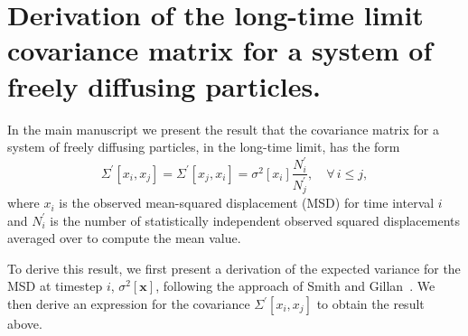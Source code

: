 \documentclass[reprint,superscriptaddress,nobibnotes,amsmath,amssymb,aps,prx,hidelinks,linenumbers]{revtex4-2}
\newcommand{\oMSD}{\ensuremath{\bm{x}}}
\newcommand{\oMSDi}{\ensuremath{x_i}}
\newcommand{\oMSDj}{\ensuremath{x_j}}
\newcommand{\nind}[1]{\ensuremath{N^\prime_{#1}}}
\newcommand{\var}[1]{\ensuremath{\sigma^2[#1]}}
\begin{document}
\twocolumngrid

\section{Derivation of the long-time limit covariance matrix for a system of freely diffusing particles.}
\label{sec:ran}
In the main manuscript we present the result that the covariance matrix for a system of freely diffusing particles, in the long-time limit, has the form
\begin{equation}
  \Sigma^\prime\left[\oMSDi, \oMSDj\right]= \Sigma^\prime\left[\oMSDj, \oMSDi\right] =
  \var{\oMSDi} \frac{\nind{i}}{\nind{j}},\hspace{1em} \forall\,i \leq j,
  \label{equ:cvv_SI}
\end{equation}
where $\oMSDi$ is the observed mean-squared displacement (MSD) for time interval $i$ and $\nind{i}$ is the number of statistically independent observed squared displacements averaged over to compute the mean value.

To derive this result, we first present a derivation of the expected variance for the MSD at timestep $i$, $\var{\oMSD}$, following the approach of Smith and Gillan~\cite{smith_random_1996}.
We then derive an expression for the covariance $\Sigma^\prime\left[\oMSDi, \oMSDj\right]$ to obtain the result above.
\end{document}
